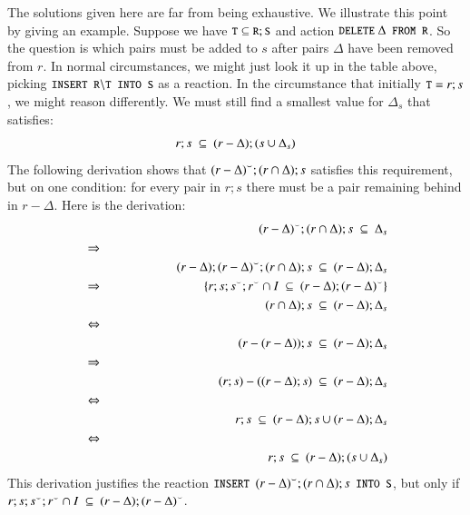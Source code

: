 \documentclass{elsarticle}
\begin{document}
	The solutions given here are far from being exhaustive.
	We illustrate this point by giving an example.
	Suppose we have $\text{\tt\small T}\subseteq\text{\tt\small R};\text{\tt\small S}$ and action $\code{DELETE}\ \Delta\code{ FROM R}$.
	So the question is which pairs must be added to $s$ after pairs $\Delta$ have been removed from $r$.
	In normal circumstances, we might just look it up in the table above, picking $\text{\tt\small INSERT R}\backslash\text{\tt\small T INTO S}$ as a reaction.
	In the circumstance that initially $\text{\tt\small T}=r;s$, we might reason differently.
	We must still find a smallest value for $\Delta_s$ that satisfies:
\begin{equation}
r;s\ \subs\ (r-\Delta);(s\cup\Delta_s)\label{lbl:nonshrinking r;s when Del from r}
\end{equation}
	The following derivation shows that ${(r-\Delta)}^\smallsmile;(r\cap\Delta);s$ satisfies this requirement,
	but on one condition: for every pair in $r;s$ there must be a pair remaining behind in $r-\Delta$.
	Here is the derivation:
\begin{eqnarray}
&&\flip{(r-\Delta)};(r\cap\Delta);s\ \subs\ \Delta_s\nonumber\\
&\Rightarrow\nonumber\\
&&(r-\Delta);\flip{(r-\Delta)};(r\cap\Delta);s\ \subs\ (r-\Delta);\Delta_s\nonumber\\
&\Rightarrow&\hspace{1in}\{r;s;\flip{s};\flip{r} \cap\iden\ \ \subs\ (r-\Delta);\flip{(r-\Delta)}\}\nonumber\\
&&(r\cap\Delta);s\ \subs\ (r-\Delta);\Delta_s\nonumber\\
&\Leftrightarrow\nonumber\\
&&(r-(r-\Delta));s\ \subs\ (r-\Delta);\Delta_s\nonumber\\
&\Rightarrow\nonumber\\
&&(r;s)-((r-\Delta);s)\ \subs\ (r-\Delta);\Delta_s\nonumber\\
&\Leftrightarrow\nonumber\\
&&r;s\ \subs\ (r-\Delta);s \cup (r-\Delta);\Delta_s\nonumber\\
&\Leftrightarrow\nonumber\\
&&r;s\ \subs\ (r-\Delta);(s \cup \Delta_s)\nonumber
\end{eqnarray}
	This derivation justifies the reaction $\code{INSERT }\flip{(r-\Delta)};(r\cap\Delta);s\code{ INTO S}$,
	but only if $r;s;\flip{s};\flip{r} \cap\iden\ \ \subs\ (r-\Delta);\flip{(r-\Delta)}$.
\end{document}
